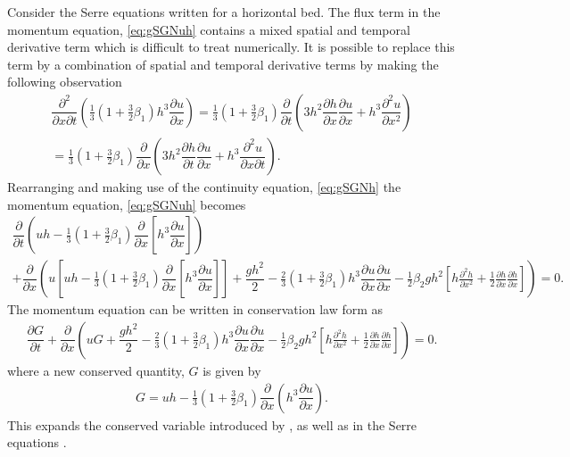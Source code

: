 \documentclass[10pt]{article}
\begin{document}
Consider the Serre equations written for a horizontal bed. The flux term in the momentum equation, \eqref{eq:gSGNuh} contains a mixed spatial and temporal derivative term which is difficult to treat numerically. It is possible to replace this term  by a combination of spatial and temporal derivative terms by making the following observation
\begin{multline}
\dfrac{\partial^2}{\partial x \partial t} \left ( \frac{1}{3}\left(1 + \frac{3}{2} \beta_1\right) h^3 \dfrac{\partial u}{\partial x} \right ) =   \frac{1}{3}\left(1 + \frac{3}{2} \beta_1\right) \dfrac{\partial }{\partial t} \left ( 3h^2 \dfrac{\partial h}{\partial x} \dfrac{\partial u}{\partial x} + h^3 \dfrac{\partial^2 u}{\partial x^2} \right ) \\=  \frac{1}{3}\left(1 + \frac{3}{2} \beta_1\right)
\dfrac{\partial }{\partial x} \left ( 3 h^2 \dfrac{\partial h}{\partial t} \dfrac{\partial u}{\partial x} + h^3 \dfrac{\partial^2 u}{\partial x \partial t} \right ).
\end{multline}
Rearranging and making use of the continuity equation, \eqref{eq:gSGNh} the momentum equation, \eqref{eq:gSGNuh} becomes
\begin{multline}
\dfrac{\partial }{\partial t} \left ( u h -  \frac{1}{3}\left(1 + \frac{3}{2} \beta_1\right) \dfrac{\partial}{\partial x} \left [h^3 \dfrac{\partial u}{\partial x}  \right ] \right ) \\ + \dfrac{\partial}{\partial x} \left ( u\left[uh - \frac{1}{3}\left(1 + \frac{3}{2} \beta_1\right) \dfrac{\partial }{\partial x} \left [ h^3 \dfrac{\partial u}{\partial x} \right ]\right] + \dfrac{gh^2}{2} - \frac{2}{3}\left(1 + \frac{3}{2} \beta_1\right) h^3\dfrac{\partial u}{\partial x}\dfrac{\partial u}{\partial x}  - \frac{1}{2} \beta_2 g h^2 \left[h\frac{\partial^2 h}{\partial x^2} + \frac{1}{2}\frac{\partial h}{\partial x}\frac{\partial h}{\partial x}\right]\right ) = 0.
\end{multline}
The momentum equation can be written in conservation law form as
\begin{gather}\label{eq:G_momentum}
\dfrac{\partial G }{\partial t}  + \dfrac{\partial}{\partial x} \left ( uG + \dfrac{gh^2}{2} - \frac{2}{3}\left(1 + \frac{3}{2} \beta_1\right) h^3\dfrac{\partial u}{\partial x}\dfrac{\partial u}{\partial x}  - \frac{1}{2} \beta_2 g h^2  \left[h\frac{\partial^2 h}{\partial x^2} + \frac{1}{2}\frac{\partial h}{\partial x}\frac{\partial h}{\partial x}\right]\right ) = 0.
\end{gather}
where a new conserved quantity, $G$ is given by
\begin{gather*}
G = uh - \frac{1}{3}\left(1 + \frac{3}{2} \beta_1\right) \dfrac{\partial }{\partial x} \left ( h^3 \dfrac{\partial u}{\partial x} \right ).
\end{gather*}
This expands the conserved variable introduced by \cite{Clamond-Dutykh-2018-237}, as well as in the Serre equations \cite{Zoppou-etal-2017}. 
\end{document}
